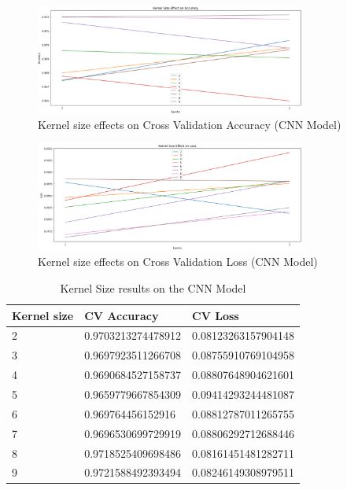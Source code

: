 \documentclass[conference]{IEEEtran}
\begin{document}
\begin{figure}[H]
    \centering
    \includegraphics[width=3.5in]{pictures/model2_kernel_size_accuracy.png}
    \caption{Kernel size effects on Cross Validation Accuracy (CNN Model)}\label{fig:model2_kernel_size_acc}
\end{figure}

\begin{figure}[H]
    \centering
    \includegraphics[width=3.5in]{pictures/model2_kernel_size_loss.png}
    \caption{Kernel size effects on Cross Validation Loss (CNN Model)}\label{fig:model2_kernel_size_loss}
\end{figure}

\begin{table}[H]
\centering
\caption{Kernel Size results on the CNN Model}
\label{table:model2_kernel_size}
\begin{tabular}{ | m{2.5em} | m{3.2cm}| m{3.2cm} | }
\hline
Kernel size & CV Accuracy & CV Loss \\ 
\hline
2 & 0.9703213274478912 & 0.08123263157904148 \\
\hline
3 & 0.9697923511266708 & 0.08755910769104958 \\
\hline
4 & 0.9690684527158737 & 0.08807648904621601 \\
\hline
5 & 0.9659779667854309 & 0.09414293244481087 \\
\hline
6 & 0.969764456152916 & 0.08812787011265755 \\
\hline
7 & 0.9696530699729919 & 0.08806292712688446 \\
\hline
8 & 0.9718525409698486 & 0.08161451481282711 \\
\hline
9 & 0.9721588492393494 & 0.08246149308979511 \\
\hline
\end{tabular}
\end{table}
\end{document}
